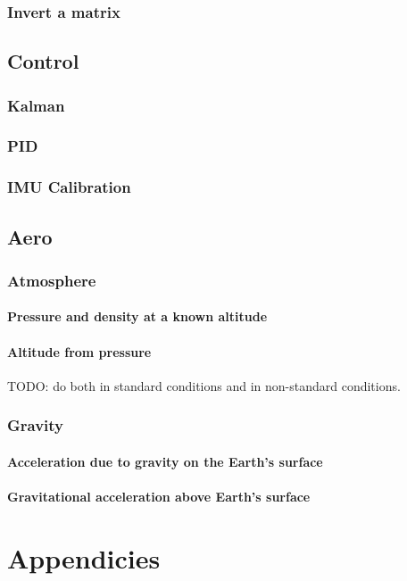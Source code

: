 \documentclass[10pt,letterpaper]{memoir} %
\begin{document}
\section{Invert a matrix}

\chapter{Control}
\section{Kalman}
\section{PID}
\section{IMU Calibration}

\chapter{Aero}
\section{Atmosphere}
\subsection{Pressure and density at a known altitude}
\subsection{Altitude from pressure}
TODO: do both in standard conditions and in non-standard conditions.

\section{Gravity}
\subsection{Acceleration due to gravity on the Earth's surface}
\subsection{Gravitational acceleration above Earth's surface}

\appendix
\part{Appendicies}
\end{document}
